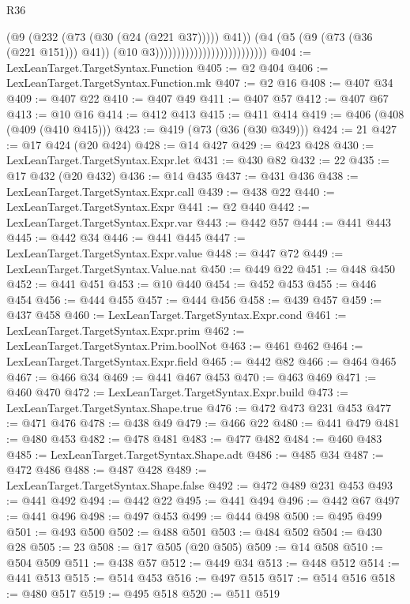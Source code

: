 \begin{lexlean}{R36}
\begin{coremodule}
                                                      (@9 (@232 (@73 (@30 (@24 (@221 @37))))) @41))
                                                    (@4
                                                      (@5 (@9 (@73 (@36 (@221 @151))) @41))
                                                      (@10 @3))))))))))))))))))))))))))
@404 := LexLeanTarget.TargetSyntax.Function
@405 := @2 @404
@406 := LexLeanTarget.TargetSyntax.Function.mk
@407 := @2 @16
@408 := @407 @34
@409 := @407 @22
@410 := @407 @49
@411 := @407 @57
@412 := @407 @67
@413 := @10 @16
@414 := @412 @413
@415 := @411 @414
@419 := @406 (@408 (@409 (@410 @415)))
@423 := @419 (@73 (@36 (@30 @349)))
@424 := 21
@427 := @17 @424 (@20 @424)
@428 := @14 @427
@429 := @423 @428
@430 := LexLeanTarget.TargetSyntax.Expr.let
@431 := @430 @82
@432 := 22
@435 := @17 @432 (@20 @432)
@436 := @14 @435
@437 := @431 @436
@438 := LexLeanTarget.TargetSyntax.Expr.call
@439 := @438 @22
@440 := LexLeanTarget.TargetSyntax.Expr
@441 := @2 @440
@442 := LexLeanTarget.TargetSyntax.Expr.var
@443 := @442 @57
@444 := @441 @443
@445 := @442 @34
@446 := @441 @445
@447 := LexLeanTarget.TargetSyntax.Expr.value
@448 := @447 @72
@449 := LexLeanTarget.TargetSyntax.Value.nat
@450 := @449 @22
@451 := @448 @450
@452 := @441 @451
@453 := @10 @440
@454 := @452 @453
@455 := @446 @454
@456 := @444 @455
@457 := @444 @456
@458 := @439 @457
@459 := @437 @458
@460 := LexLeanTarget.TargetSyntax.Expr.cond
@461 := LexLeanTarget.TargetSyntax.Expr.prim
@462 := LexLeanTarget.TargetSyntax.Prim.boolNot
@463 := @461 @462
@464 := LexLeanTarget.TargetSyntax.Expr.field
@465 := @442 @82
@466 := @464 @465
@467 := @466 @34
@469 := @441 @467 @453
@470 := @463 @469
@471 := @460 @470
@472 := LexLeanTarget.TargetSyntax.Expr.build
@473 := LexLeanTarget.TargetSyntax.Shape.true
@476 := @472 @473 @231 @453
@477 := @471 @476
@478 := @438 @49
@479 := @466 @22
@480 := @441 @479
@481 := @480 @453
@482 := @478 @481
@483 := @477 @482
@484 := @460 @483
@485 := LexLeanTarget.TargetSyntax.Shape.adt
@486 := @485 @34
@487 := @472 @486
@488 := @487 @428
@489 := LexLeanTarget.TargetSyntax.Shape.false
@492 := @472 @489 @231 @453
@493 := @441 @492
@494 := @442 @22
@495 := @441 @494
@496 := @442 @67
@497 := @441 @496
@498 := @497 @453
@499 := @444 @498
@500 := @495 @499
@501 := @493 @500
@502 := @488 @501
@503 := @484 @502
@504 := @430 @28
@505 := 23
@508 := @17 @505 (@20 @505)
@509 := @14 @508
@510 := @504 @509
@511 := @438 @57
@512 := @449 @34
@513 := @448 @512
@514 := @441 @513
@515 := @514 @453
@516 := @497 @515
@517 := @514 @516
@518 := @480 @517
@519 := @495 @518
@520 := @511 @519

\end{coremodule}
\end{lexlean}

